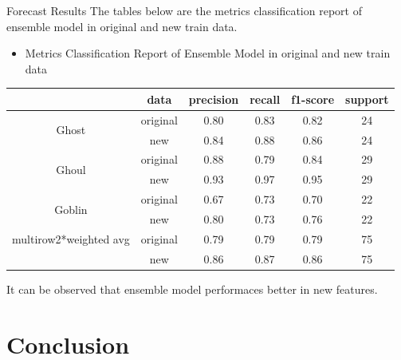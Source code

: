 \documentclass[
 size=14pt,
 paper=smartboard,  %
 mode=present, 		%
 display=slides, 	%
 style=tuliplab,  	%
 pauseslide,
 fleqn,leqno]{powerdot}
\begin{document}
\begin{slide}[toc=,bm=]{Forecast Results}
The tables below are 
the metrics classification report 
of ensemble model in 
original and new train data.
\begin{itemize}
	\item Metrics Classification Report of Ensemble Model in original and new train data
\end{itemize}
\begin{center}
	\begin{tabular}{cccccc}
		\hline
		& data &precision & recall & f1-score & support\\
		\hline
		\multirow{2}{*}{Ghost}  & original & 0.80   &   0.83  & 0.82 & 24\\
		& new &0.84  &  0.88  & 0.86 &  24\\
		\hline
		\multirow{2}{*}{Ghoul}  & original & 0.88  &  0.79  &   0.84   &   29\\
		& new & 0.93  & 0.97 &  0.95 &  29\\
		\hline
		\multirow{2}{*}{Goblin}  & original & 0.67  &  0.73 &  0.70  &   22\\
		& new  &  0.80 &  0.73  & 0.76  &  22\\
		\hline  
		multirow{2}{*}{weighted avg}  & original & 0.79  &  0.79 &  0.79  &  75\\
		& new  &  0.86 & 0.87  &  0.86  &  75\\
		\hline 
	\end{tabular}
\end{center}
It can be observed that ensemble model
performaces better in new features.

\end{slide}




\section{Conclusion}
\end{document}
